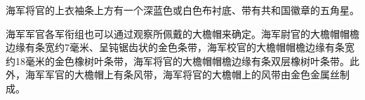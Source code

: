 海军将官的上衣袖条上方有一个深蓝色或白色布衬底、带有共和国徽章的五角星。

海军军官各军衔组也可以通过观察所佩戴的大檐帽来确定。海军尉官的大檐帽帽檐边缘有条宽约7毫米、呈钝锯齿状的金色条带，海军校官的大檐帽帽檐边缘有条宽约18毫米的金色橡树叶条带，海军将官的大檐帽帽檐边缘有条双层橡树叶条带。此外，海军军官的大檐帽上有条风带，海军将官的大檐帽上的风带由金色金属丝制成。
